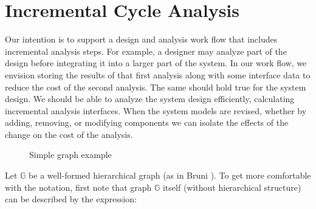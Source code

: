 \section{Incremental Cycle Analysis}

Our intention is to support a design and analysis work flow that includes 
incremental analysis steps.  For example, a designer may analyze part of the design before integrating it into a larger part of the system.  In our work flow, we envision storing the results of that first analysis along with some interface data to reduce the cost of the second analysis.  The same should hold true for the system design.  We should be able to analyze the system design efficiently, calculating incremental analysis interfaces.  When the system models are revised, whether by adding, removing, or modifying components we can isolate the effects of the change on the cost of the analysis.

\begin{figure}	
    \begin{center}
    \caption{Simple graph example}
    \end{center}
\end{figure}

Let $\mathbb{G}$ be a well-formed hierarchical graph (as in Bruni
\cite{graphs:hier_algebra}).  To get more comfortable with the notation,
first note that graph $\mathbb{G}$ itself (without hierarchical structure)
can be described by the expression:

